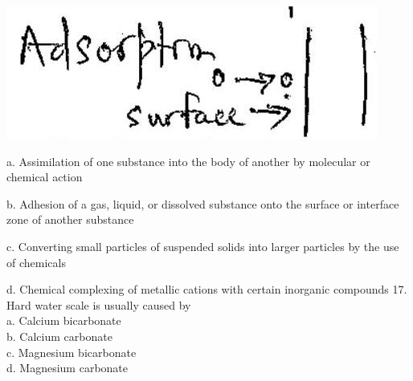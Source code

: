 \documentclass[10pt]{article}
\begin{document}
\includegraphics[max width=\textwidth]{2022_11_11_ca6a6c1a0324ee23e523g-53(4)}

a. Assimilation of one substance into the body of another by molecular or chemical action

b. Adhesion of a gas, liquid, or dissolved substance onto the surface or interface zone of another substance

c. Converting small particles of suspended solids into larger particles by the use of chemicals

d. Chemical complexing of metallic cations with certain inorganic compounds 17. Hard water scale is usually caused by\\
a. Calcium bicarbonate\\
b. Calcium carbonate\\
c. Magnesium bicarbonate\\
d. Magnesium carbonate
\end{document}
